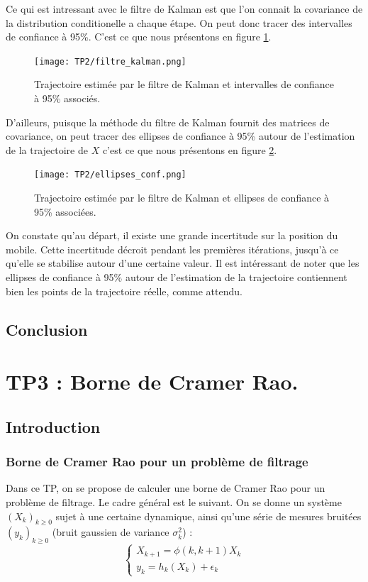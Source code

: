 \documentclass{article}
\begin{document}
Ce qui est intressant avec le filtre de Kalman est que l'on connait la covariance de la distribution
conditionelle a chaque étape. On peut donc tracer des 
intervalles de confiance à 95\%. C'est ce que nous présentons en figure \ref{ellipse}.

\begin{figure}[!htb]
   \centering
   \caption{Trajectoire estimée par le filtre de Kalman et intervalles de confiance à 95\% associés.}
   \label{ellipse}
   \texttt{[image: TP2/filtre\_kalman.png]}
\end{figure}

D'ailleurs, puisque la méthode du filtre de Kalman fournit des matrices de covariance, on 
peut tracer des ellipses de confiance à 95\% autour de l'estimation de la trajectoire
de $X$ c'est ce que nous présentons en figure \ref{ellipse_conf}. 

\begin{figure}[!htb]
   \centering
   \caption{Trajectoire estimée par le filtre de Kalman et ellipses de confiance à 95\% associées.}
   \label{ellipse_conf}
   \texttt{[image: TP2/ellipses\_conf.png]}
\end{figure}

On constate qu'au départ, il existe une grande incertitude sur la position du mobile.
Cette incertitude décroit pendant les premières itérations, jusqu'à ce qu'elle se stabilise autour d'une certaine valeur.
Il est intéressant de noter que les ellipses de confiance à 95\% autour de 
l'estimation de la trajectoire contiennent bien les points de la trajectoire réelle,
comme attendu.
\subsection{Conclusion}



\clearpage


\section{TP3 : Borne de Cramer Rao.}
\subsection{Introduction}
\subsubsection{Borne de Cramer Rao pour un problème de filtrage}

Dans ce TP, on se propose de calculer une borne de Cramer Rao pour un problème de filtrage. Le cadre général est le suivant.
On se donne un système  $(X_{k})_{k\geq 0}$ sujet à une certaine dynamique,
ainsi qu'une série de mesures bruitées $(y_{k})_{k \geq 0}$ (bruit gaussien de variance $\sigma_{k}^{2}$) : 
\[\left\{\begin{array}{ll}
   X_{k+1} = \phi(k,k+1)X_{k} \\
   y_{k}=h_{k}(X_{k})+\epsilon_{k}
\end{array}\right. \]
\end{document}
